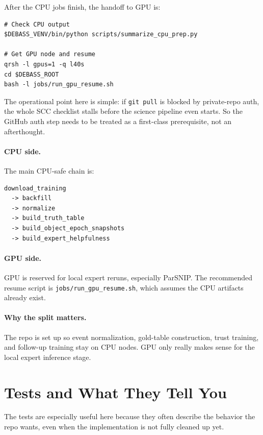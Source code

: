 \documentclass[11pt]{article}
\newcommand{\code}[1]{\texttt{#1}}
\begin{document}
After the CPU jobs finish, the handoff to GPU is:

\begin{verbatim}
# Check CPU output
$DEBASS_VENV/bin/python scripts/summarize_cpu_prep.py

# Get GPU node and resume
qrsh -l gpus=1 -q l40s
cd $DEBASS_ROOT
bash -l jobs/run_gpu_resume.sh
\end{verbatim}

The operational point here is simple: if \code{git pull} is blocked by private-repo auth, the whole SCC checklist stalls before the science pipeline even starts. So the GitHub auth step needs to be treated as a first-class prerequisite, not an afterthought.

\paragraph{CPU side.}
The main CPU-safe chain is:

\begin{verbatim}
download_training
  -> backfill
  -> normalize
  -> build_truth_table
  -> build_object_epoch_snapshots
  -> build_expert_helpfulness
\end{verbatim}

\paragraph{GPU side.}
GPU is reserved for local expert reruns, especially ParSNIP. The recommended resume script is \code{jobs/run\_gpu\_resume.sh}, which assumes the CPU artifacts already exist.

\paragraph{Why the split matters.}
The repo is set up so event normalization, gold-table construction, trust training, and follow-up training stay on CPU nodes. GPU only really makes sense for the local expert inference stage.

\section{Tests and What They Tell You}

The tests are especially useful here because they often describe the behavior the repo wants, even when the implementation is not fully cleaned up yet.
\end{document}
